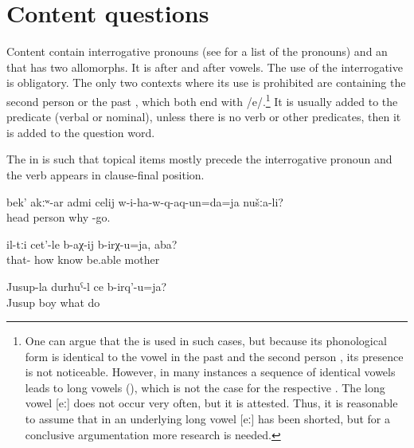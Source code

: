 
\section{Content questions}
\label{sec:Content questions}

Content  contain interrogative pronouns (see  for a list of the pronouns) and an  that has two allomorphs. It is  after  and  after vowels. The use of the interrogative  is obligatory. The only two contexts where its use is prohibited are  containing the second person   or the past  , which both end with /e/.\footnote{One can argue that the   is used in such cases, but because its phonological form is identical to the vowel in the past  and the second person , its presence is not noticeable. However, in many instances a sequence of identical vowels leads to long vowels (), which is not the case for the respective . The long vowel [eː] does not occur very often, but it is attested. Thus, it is reasonable to assume that in  an underlying long vowel [eː] has been shorted, but for a conclusive argumentation more research is needed.} It is usually added to the predicate (verbal or nominal), unless there is no verb or other predicates, then it is added to the question word.

The  in  is such that topical items mostly precede the interrogative pronoun and the verb appears in clause-final position.
%
\begin{exe}
	\ex	\label{ex:‎Why did we send a man without a head there into (the cave)}
	\gll	bek'	akːʷ-ar	admi	celij	w-i-ha-w-q-aq-un=da=ja	nušːa-li?\\
		head		person	why	-go.	\\
	\glt	{}

	\ex	\label{ex:‎‎‎How can you get to know them, mother}
	\gll	il-tːi	cet'-le	b-aχ-ij	b-irχ-u=ja,	aba?\\
		that-	how	know	be.able	mother\\
	\glt	{}

	\ex	\label{ex:What does Jusup's son do}
	\gll	Jusup-la	durħuˁ-l	ce	b-irq'-u=ja?\\
		Jusup	boy	what	do\\
	\glt	{}
\end{exe}

